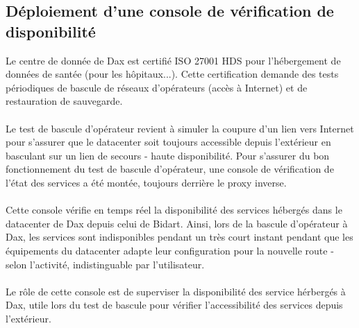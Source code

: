 \subsection{Déploiement d'une console de vérification de disponibilité}

Le centre de donnée de Dax est certifié ISO 27001 HDS pour l'hébergement de données de santée (pour les hôpitaux...). Cette certification demande des tests périodiques de bascule de réseaux d'opérateurs (accès à Internet) et de restauration de sauvegarde.
\\ \\
Le test de bascule d'opérateur revient à simuler la coupure d'un lien vers Internet pour s'assurer que le datacenter soit toujours accessible depuis l'extérieur en basculant sur un lien de secours - haute disponibilité. Pour s'assurer du bon fonctionnement du test de bascule d'opérateur, une console de vérification de l'état des services a été montée, toujours derrière le proxy inverse.
\\ \\
Cette console vérifie en temps réel la disponibilité des services hébergés dans le datacenter de Dax depuis celui de Bidart. Ainsi, lors de la bascule d'opérateur à Dax, les services sont indisponibles pendant un très court instant pendant que les équipements du datacenter adapte leur configuration pour la nouvelle route - selon l'activité, indistinguable par l'utilisateur.
\\ \\
Le rôle de cette console est de superviser la disponibilité des service hérbergés à Dax, utile lors du test de bascule pour vérifier l'accessibilité des services depuis l'extérieur.

